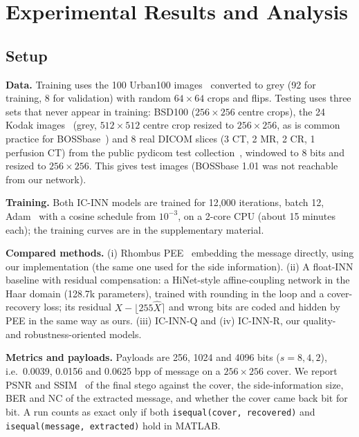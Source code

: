 
\section{Experimental Results and Analysis}
\subsection{Setup}
\textbf{Data.} Training uses the 100 Urban100 images~\cite{huang2015urban} converted to grey (92 for training, 8 for
validation) with random $64\times64$ crops and flips. Testing uses three sets that never appear in training: BSD100
\cite{martin2001bsd} ($256\times256$ centre crops), the 24 Kodak images~\cite{kodak} (grey, $512\times512$ centre crop
resized to $256\times256$, as is common practice for BOSSbase~\cite{bas2011boss}) and 8 real DICOM slices (3 CT, 2 MR,
2 CR, 1 perfusion CT) from the public pydicom test collection~\cite{pydicomdata}, windowed to 8 bits and resized to
$256\times256$. This gives \nImgs{} test images (BOSSbase 1.01 was not reachable from our network).

\textbf{Training.} Both IC-INN models are trained for 12{,}000 iterations, batch 12, Adam~\cite{kingma2015adam} with a
cosine schedule from $10^{-3}$, on a 2-core CPU (about 15 minutes each); the training curves are in the supplementary
material.

\textbf{Compared methods.} (i) Rhombus PEE~\cite{sachnev2009} embedding the message directly, using our implementation
(the same one used for the side information). (ii) A float-INN baseline with residual compensation: a HiNet-style
\cite{jing2021hinet} affine-coupling network in the Haar domain (128.7k parameters), trained with rounding in the loop and
a cover-recovery loss; its residual $X-\lfloor 255\hat X\rceil$ and wrong bits are coded and hidden by PEE in the same way
as ours. (iii) IC-INN-Q and (iv) IC-INN-R, our quality- and robustness-oriented models.

\textbf{Metrics and payloads.} Payloads are 256, 1024 and 4096 bits ($s=8,4,2$), i.e.\ 0.0039, 0.0156 and 0.0625 bpp
of message on a $256\times256$ cover. We report PSNR and SSIM~\cite{wang2004ssim} of the final stego against the cover,
the side-information size, BER and NC of the extracted message, and whether the cover came back bit for bit. A run counts
as exact only if both \texttt{isequal(cover, recovered)} and \texttt{isequal(message, extracted)} hold in MATLAB.

